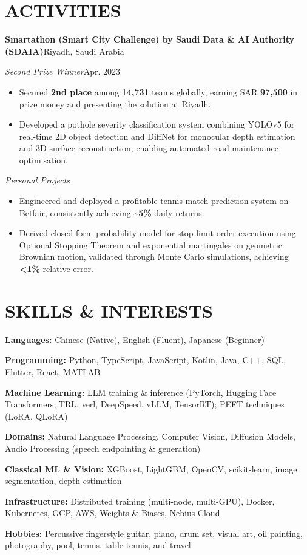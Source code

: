 \documentclass[10pt,a4paper]{article}
\newcommand{\headerinfo}[2]{%
    \textit{#1}\hfill #2\par\vspace{-0.5\baselineskip}%
}
\newcommand{\experience}[4]{%
    \textbf{#1}\hfill #2\par\vspace{-0.5\baselineskip}%
    \textit{#3}\hfill #4\par\vspace{-0.5\baselineskip}%
}
\begin{document}
\section{ACTIVITIES}
\experience{Smartathon (Smart City Challenge) by Saudi Data \& AI Authority (SDAIA)}{Riyadh, Saudi Arabia}
{Second Prize Winner}{Apr. 2023}
\begin{itemize}
    \item Secured \textbf{2nd place} among \textbf{14,731} teams globally, earning SAR \textbf{97,500} in prize money and presenting the solution at Riyadh.
    \item Developed a pothole severity classification system combining YOLOv5 for real-time 2D object detection and DiffNet for monocular depth estimation and 3D surface reconstruction, enabling automated road maintenance optimisation.
\end{itemize}

\headerinfo{Personal Projects}{}
\begin{itemize}
    \item Engineered and deployed a profitable tennis match prediction system on Betfair, consistently achieving \textbf{\textasciitilde{}5\%} daily returns.
    \item Derived closed-form probability model for stop-limit order execution using Optional Stopping Theorem and exponential martingales on geometric Brownian motion, validated through Monte Carlo simulations, achieving \textbf{<1\%} relative error.
\end{itemize}

\section{SKILLS \& INTERESTS}
\textbf{Languages:} Chinese (Native), English (Fluent), Japanese (Beginner)\par\vspace{-0.3\baselineskip}
\textbf{Programming:} Python, TypeScript, JavaScript, Kotlin, Java, C++, SQL, Flutter, React, MATLAB\par\vspace{-0.3\baselineskip}
\textbf{Machine Learning:} LLM training \& inference (PyTorch, Hugging Face Transformers, TRL, verl, DeepSpeed, vLLM, TensorRT); PEFT techniques (LoRA, QLoRA)\par\vspace{-0.3\baselineskip}
\textbf{Domains:} Natural Language Processing, Computer Vision, Diffusion Models, Audio Processing (speech endpointing \& generation)\par\vspace{-0.3\baselineskip}
\textbf{Classical ML \& Vision:} XGBoost, LightGBM, OpenCV, scikit-learn, image segmentation, depth estimation\par\vspace{-0.3\baselineskip}
\textbf{Infrastructure:} Distributed training (multi-node, multi-GPU), Docker, Kubernetes, GCP, AWS, Weights \& Biases, Nebius Cloud\par\vspace{-0.3\baselineskip}
\textbf{Hobbies:} Percussive fingerstyle guitar, piano, drum set, visual art, oil painting, photography, pool, tennis, table tennis, and travel
\end{document}
